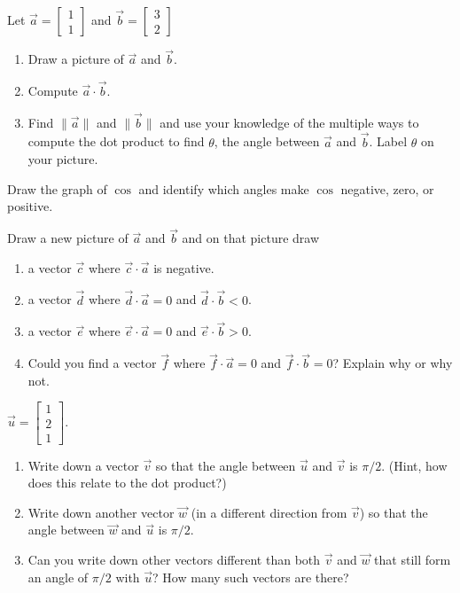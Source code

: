 \documentclass{article}
\begin{document}
	\begin{Enum}
		\item Let $\vec a=\begin{bmatrix}1\\1\end{bmatrix}$ and $\vec b=\begin{bmatrix}3\\2\end{bmatrix}$
		\begin{enumerate}	
			\item Draw a picture of $\vec a $ and $\vec b$.
			\item Compute $\vec a\cdot \vec b$.
			\item Find $\|\vec a\|$ and $\|\vec b\|$ and use your knowledge of
			the multiple ways to compute the dot product to find $\theta$,
			the angle between $\vec a$ and $\vec b$. Label $\theta$ on your picture.
		\end{enumerate}
		\item Draw the graph of $\cos$ and identify which angles make $\cos$ negative, zero,
		or positive.

		\item Draw a new picture of $\vec a$ and $\vec b$ and on that picture draw
		\begin{enumerate}	
			\item a vector $\vec c$ where $\vec c\cdot \vec a$ is negative.
			\item a vector $\vec d$ where $\vec d\cdot \vec a=0$ and $\vec d\cdot \vec b < 0$.
			\item a vector $\vec e$ where $\vec e\cdot \vec a=0$ and $\vec e\cdot \vec b>0$.
			\item Could you find a vector $\vec f$ where $\vec f\cdot \vec a=0$ and $\vec f\cdot \vec b=0$?
			Explain why or why not.
		\end{enumerate}

		\item $\vec u=\begin{bmatrix}1\\2\\1\end{bmatrix}$.
		\begin{enumerate}
			\item Write down a vector $\vec v$ so that the angle between $\vec u$ and $\vec v$
			is $\pi/2$. (Hint, how does this relate to the dot product?)
			\item Write down another vector $\vec w$ (in a different direction from $\vec v$)
			so that the angle between $\vec w$ and $\vec u$ is $\pi/2$.
			\item Can you write down other vectors different than both $\vec v$ and $\vec w$ that still
			form an angle of $\pi/2$ with $\vec u$?  How many such vectors are there?
		\end{enumerate}
	\end{Enum}
\end{document}
